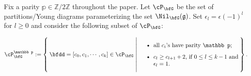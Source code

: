 \documentclass[12pt,a4paper]{amsart}
\newcommand{\g}{\mathfrak g}
\newcommand{\Z}{\mathbb{Z}}
\numberwithin{equation}{section}
\theoremstyle{remark}
\begin{document}


 Fix a parity $\mathbb p\in \Z/2\Z$ throughout the paper.
Let $\cP_{\bfG}$ be the set of partitions/Young diagrams parameterizing the set
$\Nil_{\bfG}(\g)$.  Set $\epsilon_l = \epsilon(-1)^{l}$ for $l\geq 0$ and
consider the following subset of $\cP_{\bfG}$:

\begin{equation}\label{eq:conditionS}
\cP^{\mathbb p}_{\bfG}:= \Set{\bfdd = [c_0,c_1,\cdots, c_k]\in
  \cP_{\bfG}|  \parbox[c]{17em}{
    \begin{itemize}
    \item all $c_i$'s have parity $\mathbb p$;
    \item $c_{l} \geq c_{l+1} + 2$, if $0\leq l\leq k-1$ and $\epsilon_l = 1$.
    \end{itemize}} }.
\end{equation}
\end{document}
